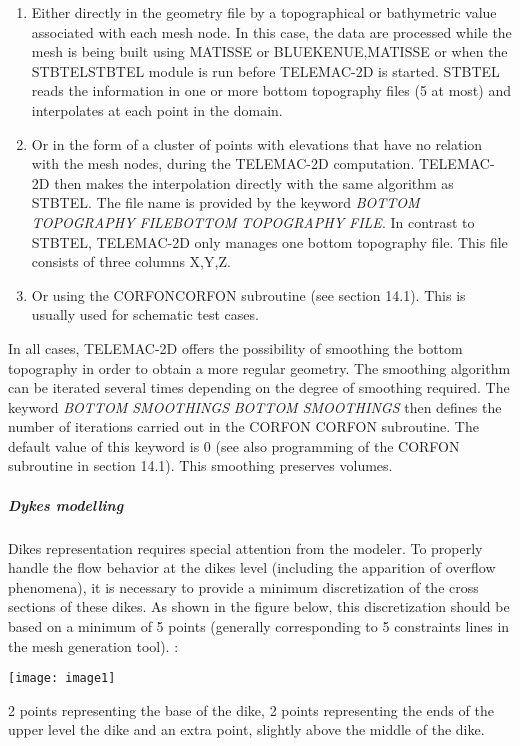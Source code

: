 \documentclass{article} %
\begin{document}
\begin{enumerate}
\item  Either directly in the geometry file by a topographical or bathymetric value associated with each mesh node. In this case, the data are processed while the mesh is being built using MATISSE or BLUEKENUE,MATISSE or when the STBTELSTBTEL module is run before TELEMAC-2D is started. STBTEL reads the information in one or more bottom topography files (5 at most) and interpolates at each point in the domain.

\item  Or in the form of a cluster of points with elevations that have no relation with the mesh nodes, during the TELEMAC-2D computation. TELEMAC-2D then makes the interpolation directly with the same algorithm as STBTEL. The file name is provided by the keyword \textit{BOTTOM TOPOGRAPHY FILEBOTTOM TOPOGRAPHY FILE}. In contrast to STBTEL, TELEMAC-2D only manages one bottom topography file. This file consists of three columns X,Y,Z.

\item  Or using the CORFONCORFON subroutine (see section 14.1). This is usually used for schematic test cases.
\end{enumerate}

 In all cases, TELEMAC-2D offers the possibility of smoothing the bottom topography in order to obtain a more regular geometry. The smoothing algorithm can be iterated several times depending on the degree of smoothing required. The keyword \textit{BOTTOM SMOOTHINGS} \textit{BOTTOM SMOOTHINGS} then defines the number of iterations carried out in the CORFON CORFON subroutine. The default value of this keyword is 0 (see also programming of the CORFON subroutine in section 14.1). This smoothing preserves volumes.


\subparagraph{ Dykes modelling}

 Dikes representation requires special attention from the modeler. To properly handle the flow behavior at the dikes level (including the apparition of overflow phenomena), it is necessary to provide a minimum discretization of the cross sections of these dikes. As shown in the figure below, this discretization should be based on a minimum of 5 points (generally corresponding to 5 constraints lines in the mesh generation tool). :

 \texttt{[image: image1]}

 2 points representing the base of the dike, 2 points representing the ends of the upper level the dike and an extra point, slightly above the middle of the dike.
\end{document}
